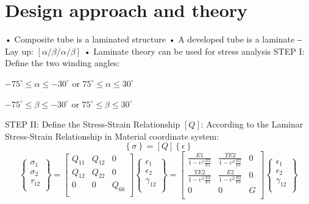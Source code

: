 \documentclass[12pt]{article}
\begin{document}
\section{Design approach and theory}
• Composite tube is a laminated structure
• A developed tube is a laminate ‒ Lay up: $[\alpha /\beta /\alpha /\beta ]$
• Laminate theory can be used for stress analysis
\newline
\noindent STEP I: Define the two winding angles:\newline
\begin{center}
$-75^{\circ} \leq \alpha \leq -30^{\circ}$ or $75^{\circ} \leq \alpha \leq 30^{\circ}$\end{center}
\begin{center}
$-75^{\circ} \leq \beta \leq -30^{\circ}$ or $75^{\circ} \leq \beta \leq 30^{\circ}$
\end{center}
\noindent STEP II: Define the Stress-Strain Relationship $\left[ Q \right]$:\newline
According to the Laminar Stress-Strain Relationship in Material coordinate system: \newline$$\left\{ \sigma \right\} = \left[Q \right] \left\{ \epsilon \right\}$$
$$\left\{ \begin{matrix}
    \sigma_1  \\
    \sigma_2  \\
    \tau_{12}  \\
    \end{matrix} \right\} = \left[\begin{matrix}
		Q_{11} & Q_{12} & 0 \\
		Q_{12} & Q_{22} & 0 \\
		0 & 0 & Q_{66} \\
		\end{matrix} \right] \left\{ \begin{matrix}
			\epsilon_1  \\
			\epsilon_2  \\
			\gamma_{12}  \\
			\end{matrix} \right\} = \left[\begin{matrix}
				\frac{E1}{1-\upsilon^2\frac{E2}{E1}} & \frac{\Upsilon E2}{1-\upsilon^2\frac{E2}{E1}} & 0 \\
				\frac{\Upsilon E2}{1-\upsilon^2\frac{E2}{E1}} & \frac{E2}{1-\upsilon^2\frac{E2}{E1}} & 0 \\
				0 & 0 & G \\
				\end{matrix} \right] \left\{ \begin{matrix}
					\epsilon_1  \\
					\epsilon_2  \\
					\gamma_{12}  \\
					\end{matrix} \right\}$$
\end{document}
